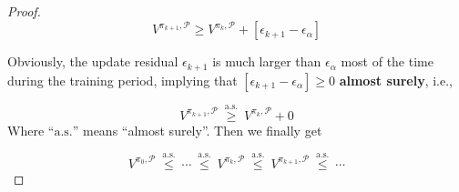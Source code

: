 \begin{proof}
\begin{equation}
{V}^{\pi_{k+1}, \mathcal{P}}\geq {V}^{\pi_{k}, \mathcal{P}} + \left[\epsilon_{k+1} - \epsilon_\alpha\right]
\end{equation}

Obviously, the update residual $\epsilon_{k+1}$ is much larger than $\epsilon_\alpha$ most of the time during the training period, implying that $\left[\epsilon_{k+1} - \epsilon_\alpha\right]\geq 0$ \textbf{almost surely}, i.e.,

\begin{equation}
{V}^{\pi_{k+1}, \mathcal{P}}\ \overset{\mathrm{a.s.}}{\geq}\ {V}^{\pi_{k}, \mathcal{P}}+0 
\end{equation}
Where ``$\mathrm{a.s.}$'' means ``almost surely''. Then we finally get

\begin{equation}
{V}^{\pi_{0}, \mathcal{P}}\ \overset{\mathrm{a.s.}}{\leq}\ \cdots\ \overset{\mathrm{a.s.}}{\leq}\ {V}^{\pi_{k}, \mathcal{P}}\ \overset{\mathrm{a.s.}}{\leq}\ {V}^{\pi_{k+1}, \mathcal{P}}\ \overset{\mathrm{a.s.}}{\leq}\ \cdots
\end{equation}

\end{proof}